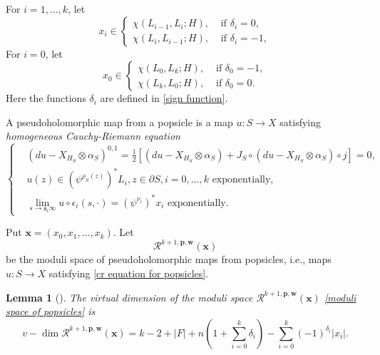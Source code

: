 \documentclass[11pt]{amsproc}
\def\cR{\mathcal{R}}
\def\e{\epsilon}
\def\e{\epsilon}
\def\d{\delta}
\def\p{\partial}
\def\sk{\mathfrak{s}}
\newtheorem{lem}{Lemma}[section]
\def\e{\epsilon}
\theoremstyle{remark}
\numberwithin{equation}{section}
\begin{document}
For $i = 1, \ldots, k$, let 
\begin{equation}
x_{i} \in 
\begin{cases}
\chi(L_{i-1}, L_{i}; H), & \text{ if } \d_{i} = 0, \\
\chi(L_{i}, L_{i-1}; H), & \text{ if } \d_{i} = -1,
\end{cases}
\end{equation}
For $i=0$, let 
\begin{equation}
x_{0} \in 
\begin{cases}
\chi(L_{0}, L_{k}; H), & \text{ if } \d_{0} = -1, \\
\chi(L_{k}, L_{0}; H), & \text{ if } \d_{0} = 0.
\end{cases}
\end{equation}
Here the functions $\d_{i}$ are defined in \eqref{sign function}.


A pseudoholomorphic map from a popsicle is a map $u: S \to X$ satisfying {\it homogeneous Cauchy-Riemann equation}
\begin{equation}\label{cr equation for popsicles}
\begin{cases}
& (du-X_{H_{S}} \otimes \alpha_{S})^{0, 1} = \frac{1}{2} [ (du-X_{H_{S}} \otimes \alpha_{S}) + J_{S} \circ (du-X_{H_{S}} \otimes \alpha_{S}) \circ j] = 0, \\
& u(z) \in (\psi^{\rho_{S}(z)})^{*} L_{i}, z \in \p S, i = 0, \ldots, k \text{ exponentially},\\
& \lim\limits_{s \to \sk_{i}\infty} u \circ \e_{i}(s, \cdot) = (\psi^{\nu_{i}})^{*} x_{i} \text{ exponentially}.
\end{cases}
\end{equation}

Put $\mathbf{x} = (x_{0}, x_{1}, \ldots, x_{k})$.
Let 
\begin{equation}\label{moduli space of popsicles}
\cR^{k+1, \mathbf{p}, \mathbf{w}}(\mathbf{x})
\end{equation}
be the moduli space of pseudoholomorphic maps from popsicles, i.e., maps $u: S \to X$ satisfying \eqref{cr equation for popsicles}.

\begin{lem}[{\cite[Lemma 3.5]{GGV}}]
The virtual dimension of the moduli space $\cR^{k+1, \mathbf{p}, \mathbf{w}}(\mathbf{x})$ \eqref{moduli space of popsicles} is
\begin{equation}
v-\dim \cR^{k+1, \mathbf{p}, \mathbf{w}}(\mathbf{x}) = k - 2 + |F| + n(1+\sum_{i=0}^{k} \d_{i}) - \sum_{i=0}^{k} (-1)^{\d_{i}} |x_{i}|.
\end{equation}
\end{lem}
\end{document}
